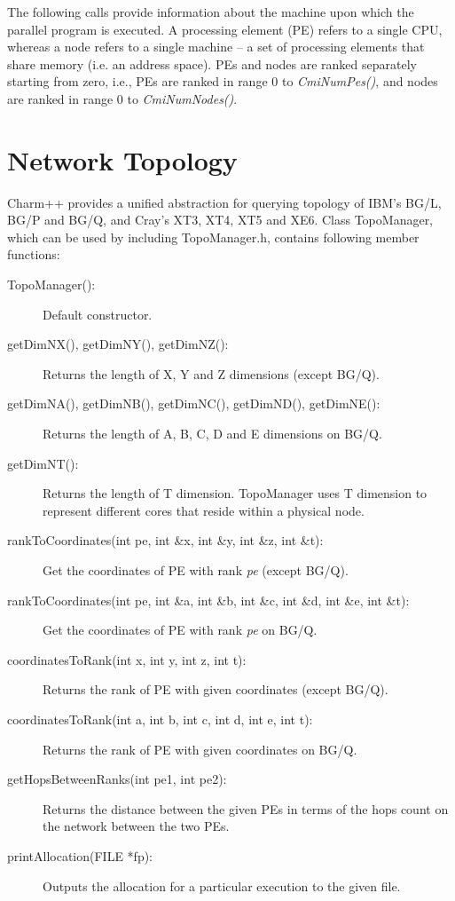 The following calls provide information about the machine upon which the
parallel program is executed. A processing element (PE) refers to a single CPU,
whereas a node refers to a single machine -- a set of processing elements that share
memory (i.e. an address space).  PEs and nodes are ranked separately starting
from zero, i.e., PEs are ranked in range 0 to {\em CmiNumPes()}, and nodes are
ranked in range 0 to {\em CmiNumNodes()}.

\section{Network Topology}
Charm++ provides a unified abstraction for querying topology of IBM's BG/L, BG/P
and BG/Q, and Cray's XT3, XT4, XT5 and XE6. Class TopoManager, which can be used 
by including TopoManager.h, contains following member functions:

\begin{description}
\item [TopoManager():] Default constructor.
\item [getDimNX(), getDimNY(), getDimNZ():] Returns the length of X, Y and Z
dimensions (except BG/Q).
\item [getDimNA(), getDimNB(), getDimNC(), getDimND(), getDimNE():] Returns the
length of A, B, C, D and E dimensions on BG/Q.
\item [getDimNT():] Returns the length of T dimension. TopoManager uses T
dimension to represent different cores that reside within a physical node.
\item [rankToCoordinates(int pe, int \&x, int \&y, int \&z, int \&t):] Get the
coordinates of PE with rank {\em pe} (except BG/Q).
\item [rankToCoordinates(int pe, int \&a, int \&b, int \&c, int \&d, int \&e, int
\&t):] Get the coordinates of PE with rank {\em pe} on BG/Q.
\item [coordinatesToRank(int x, int y, int z, int t):] Returns the rank of PE
with given coordinates (except BG/Q).
\item [coordinatesToRank(int a, int b, int c, int d, int e, int t):] Returns the
rank of PE with given coordinates on BG/Q.
\item [getHopsBetweenRanks(int pe1, int pe2):] Returns the distance between the
given PEs in terms of the hops count on the network between the two PEs.
\item [printAllocation(FILE *fp):] Outputs the allocation for a particular
execution to the given file.
\end{description}

